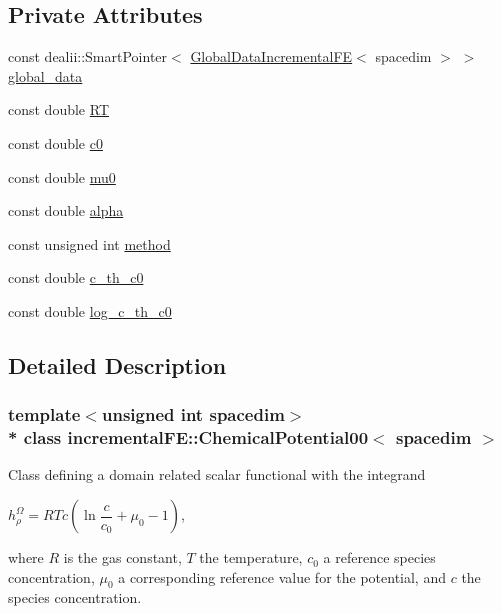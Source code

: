 \subsection*{Private Attributes}
\begin{DoxyCompactItemize}
\item 
const dealii\+::\+Smart\+Pointer$<$ \hyperlink{classincremental_f_e_1_1_global_data_incremental_f_e}{Global\+Data\+Incremental\+FE}$<$ spacedim $>$ $>$ \hyperlink{classincremental_f_e_1_1_chemical_potential00_a1dcd80b6f6f2906c38ad490d519e3123}{global\+\_\+data}
\item 
const double \hyperlink{classincremental_f_e_1_1_chemical_potential00_a4c90a618bdb704a4d8d36438af323408}{RT}
\item 
const double \hyperlink{classincremental_f_e_1_1_chemical_potential00_a99a75102bed91046fbbf9098de7ecd89}{c0}
\item 
const double \hyperlink{classincremental_f_e_1_1_chemical_potential00_a64b01fb87580d416b201175e7e819bcb}{mu0}
\item 
const double \hyperlink{classincremental_f_e_1_1_chemical_potential00_ad00b92c170d812c26e6429f07dd16790}{alpha}
\item 
const unsigned int \hyperlink{classincremental_f_e_1_1_chemical_potential00_ac264752dace0c782bf4c1fe5d620e6dc}{method}
\item 
const double \hyperlink{classincremental_f_e_1_1_chemical_potential00_aa8dbd044f314f694e09c7a1214e4a1a9}{c\+\_\+th\+\_\+c0}
\item 
const double \hyperlink{classincremental_f_e_1_1_chemical_potential00_ac3da130e727c8a08f7616cf01c4a2826}{log\+\_\+c\+\_\+th\+\_\+c0}
\end{DoxyCompactItemize}


\subsection{Detailed Description}
\subsubsection*{template$<$unsigned int spacedim$>$\\*
class incremental\+F\+E\+::\+Chemical\+Potential00$<$ spacedim $>$}

Class defining a domain related scalar functional with the integrand

$h^\Omega_\rho = RTc \left( \ln\dfrac{c}{c_0} + \mu_0 -1 \right)$,

where $R$ is the gas constant, $T$ the temperature, $c_0$ a reference species concentration, $\mu_0$ a corresponding reference value for the potential, and $c$ the species concentration.

